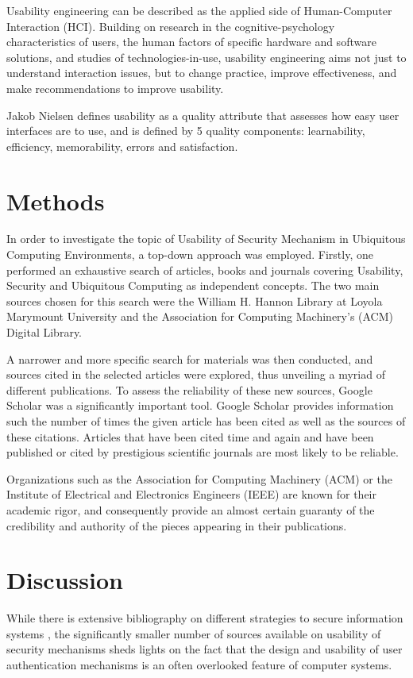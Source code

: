 \documentclass{article}
\begin{document}
Usability engineering can be described as the applied side of Human-Computer Interaction (HCI). Building on research in the cognitive-psychology characteristics of users, the human factors of specific hardware and software solutions, and studies of technologies-in-use, usability engineering aims not just to understand interaction issues, but to change practice, improve effectiveness, and make recommendations to improve usability.  

Jakob Nielsen\cite{nielsenusability2012} defines usability as a quality attribute that assesses how easy user interfaces are to use, and is defined by 5 quality components: learnability, efficiency, memorability, errors and satisfaction. 

\section{Methods}
In order to investigate the topic of Usability of Security Mechanism in Ubiquitous Computing Environments, a top-down approach was employed. Firstly, one performed an exhaustive search of articles, books and journals covering Usability, Security and Ubiquitous Computing as independent concepts. The two main sources chosen for this search were the William H. Hannon Library at Loyola Marymount University and the Association for Computing Machinery’s (ACM) Digital Library.  

A narrower and more specific search for materials was then conducted, and sources cited in the selected articles were explored, thus unveiling a myriad of different publications. To assess the reliability of these new sources, Google Scholar was a significantly important tool. Google Scholar provides information such the number of times the given article has been cited as well as the sources of these citations.  Articles that have been cited time and again and have been published or cited by prestigious scientific journals are most likely to be reliable.

Organizations such as the Association for Computing Machinery (ACM) or the Institute of Electrical and Electronics Engineers (IEEE) are known for their academic rigor, and consequently provide an almost certain guaranty of the credibility and authority of the pieces appearing in their publications. 


\section{Discussion}
While there is extensive bibliography on different strategies to secure information systems , the significantly smaller number of sources available on usability of security mechanisms sheds lights on the fact that the design and usability of user authentication mechanisms is an often overlooked feature of computer systems.
\end{document}
